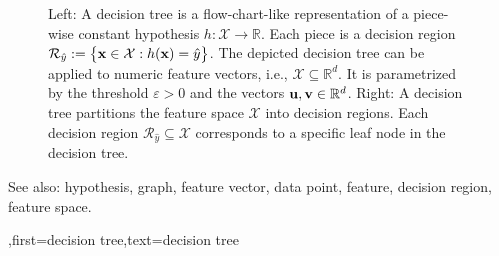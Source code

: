{{\begin{figure}[H]
\begin{minipage}{.45\textwidth}
\end{minipage}
	\caption{Left: A decision tree is a flow-chart-like representation of a piece-wise constant hypothesis $h: \mathcal{X} \rightarrow \mathbb{R}$.  Each piece is a decision region $\mathcal{R}_{\hat{y}} := \big\{ {\bf x} \in  \mathcal{X}: h({\bf x}) = \hat{y} \big\}$. 
		The depicted decision tree can be applied to numeric feature vectors, i.e., $\mathcal{X} \subseteq \mathbb{R}^{d}$. It is  parametrized by the threshold $\varepsilon>0$ and the vectors ${\bf u}, {\bf v} \in \mathbb{R}^{d}$. 
		Right: A decision tree partitions  
		the feature space $\mathcal{X}$ into decision regions. Each decision region  
		$\mathcal{R}_{\hat{y}} \!\subseteq\!\mathcal{X}$ corresponds to a specific leaf node in the decision tree.}
	\label{fig_decision_tree}
\end{figure} 
		See also: hypothesis, graph, feature vector, data point, feature, decision region, feature space.
	  }
	  ,first={decision tree},text={decision tree} }



